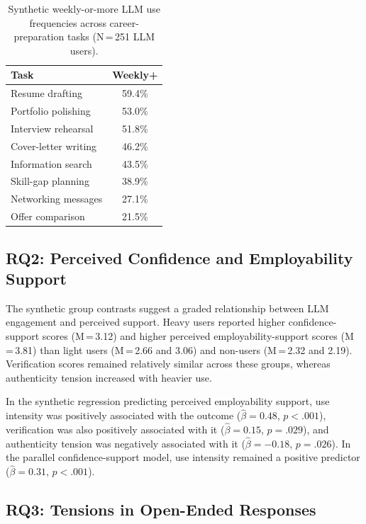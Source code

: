 \documentclass[sigconf,review,anonymous]{acmart}
\begin{document}
\begin{table}[tb]
  \caption{Synthetic weekly-or-more LLM use frequencies across career-preparation tasks (N\,=\,251 LLM users).}
  \label{tab:task-use}
  \small
  \begin{tabular}{lc}
    \toprule
    \textbf{Task} & \textbf{Weekly+} \\
    \midrule
    Resume drafting          & 59.4\% \\
    Portfolio polishing      & 53.0\% \\
    Interview rehearsal      & 51.8\% \\
    Cover-letter writing     & 46.2\% \\
    Information search       & 43.5\% \\
    Skill-gap planning       & 38.9\% \\
    Networking messages      & 27.1\% \\
    Offer comparison         & 21.5\% \\
    \bottomrule
  \end{tabular}
\end{table}

\subsection{RQ2: Perceived Confidence and Employability Support}

The synthetic group contrasts suggest a graded relationship between LLM engagement and perceived support. Heavy users reported higher confidence-support scores (M\,=\,3.12) and higher perceived employability-support scores (M\,=\,3.81) than light users (M\,=\,2.66 and 3.06) and non-users (M\,=\,2.32 and 2.19). Verification scores remained relatively similar across these groups, whereas authenticity tension increased with heavier use.

In the synthetic regression predicting perceived employability support, use intensity was positively associated with the outcome ($\hat{\beta} = 0.48$, $p < .001$), verification was also positively associated with it ($\hat{\beta} = 0.15$, $p = .029$), and authenticity tension was negatively associated with it ($\hat{\beta} = -0.18$, $p = .026$). In the parallel confidence-support model, use intensity remained a positive predictor ($\hat{\beta} = 0.31$, $p < .001$).

\subsection{RQ3: Tensions in Open-Ended Responses}
\end{document}
